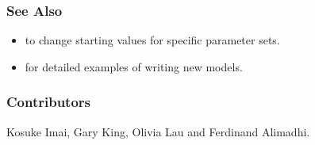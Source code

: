 \subsubsection{See Also}
\begin{itemize}
\item {} to change starting values for specific
parameter sets.  
\item {} for detailed examples of writing new models.  
\end{itemize}

\subsubsection{Contributors}

Kosuke Imai, Gary King, Olivia Lau and Ferdinand Alimadhi.

